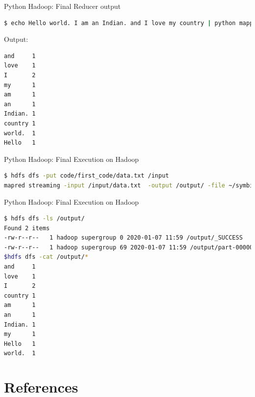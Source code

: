 \documentclass[pdf]{beamer}
\begin{document}
\begin{frame}[fragile]{Python Hadoop: Final Reducer output}
\begin{lstlisting}[language=bash]
$ echo Hello world. I am an Indian. and I love my country | python mapper.py | python reducer.py
\end{lstlisting}
Output:
\begin{lstlisting}[language=bash]
and     1
love    1
I       2
my      1
am      1
an      1
Indian. 1
country 1
world.  1
Hello   1
\end{lstlisting}
\end{frame}


\begin{frame}[fragile]{Python Hadoop: Final Execution on Hadoop}
\begin{lstlisting}[language=bash]
$ hdfs dfs -put code/first_code/data.txt /input
mapred streaming -input /input/data.txt  -output /output/ -file ~/symbiosis/code/first_code/mapper.py -mapper ~/symbiosis/code/first_code/mapper.py -file ~/symbiosis/code/first_code/reducer.py -reducer ~/symbiosis/code/first_code/reducer.py
\end{lstlisting}
\end{frame}

\begin{frame}[fragile]{Python Hadoop: Final Execution on Hadoop}
\begin{lstlisting}[language=bash]
$ hdfs dfs -ls /output/
Found 2 items
-rw-r--r--   1 hadoop supergroup 0 2020-01-07 11:59 /output/_SUCCESS
-rw-r--r--   1 hadoop supergroup 69 2020-01-07 11:59 /output/part-00000
$hdfs dfs -cat /output/*
and     1
love    1
I       2
country 1
am      1
an      1
Indian. 1
my      1
Hello   1
world.  1
\end{lstlisting}
\end{frame}



\section{References}
 

\end{document}

